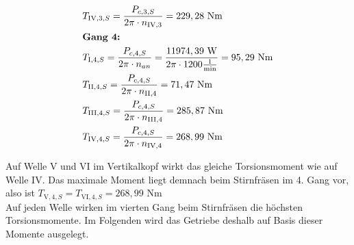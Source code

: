 \begin{itemize}
\begin{align*}
	&T_{\mathord{\mathrm{IV}},3,S} = \frac{P_{c,3,S}}{2 \pi \cdot n_{\mathord{\mathrm{IV}},3}} = 229,28 \text{ Nm} \\
	&\textbf{Gang 4: } \\
	&T_{\mathord{\mathrm{I}},4,S} = \frac{P_{c,4,S}}{2 \pi \cdot n_{an}} = \frac{11974,39 \text{ W} }{2 \pi \cdot 1200 \frac{1}{\text{min}}} =95,29 \text{ Nm} \\
	&T_{\mathord{\mathrm{II}},4,S} = \frac{P_{c,4,S}}{2 \pi \cdot n_{\mathord{\mathrm{II}},4}} =71,47\text{ Nm} \\
	&T_{\mathord{\mathrm{III}},4,S} = \frac{P_{c,4,S}}{2 \pi \cdot n_{\mathord{\mathrm{III}},4}} = 285,87 \text{ Nm} \\
	&T_{\mathord{\mathrm{IV}},4,S} = \frac{P_{c,4,S}}{2 \pi \cdot n_{\mathord{\mathrm{IV}},4}} =268,99 \text{ Nm} \\
\end{align*}	
\end{itemize}
\newpage
Auf Welle V und VI im Vertikalkopf wirkt das gleiche Torsionsmoment wie auf Welle IV. Das maximale Moment liegt demnach beim Stirnfräsen im 4. Gang vor, also ist $T_{\mathord{\mathrm{V}},4,S} = T_{\mathord{\mathrm{VI}},4,S} = 268,99 \text{ Nm}$ \\
Auf jeden Welle wirken im vierten Gang beim Stirnfräsen die höchsten Torsionsmomente. Im Folgenden wird das Getriebe deshalb auf Basis dieser Momente ausgelegt. 
